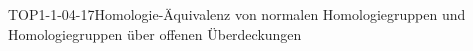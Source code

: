 
\begin{PROP}{TOP1-1-04-17}{Homologie-Äquivalenz von normalen Homologiegruppen und Homologiegruppen über offenen Überdeckungen}
\end{PROP}
